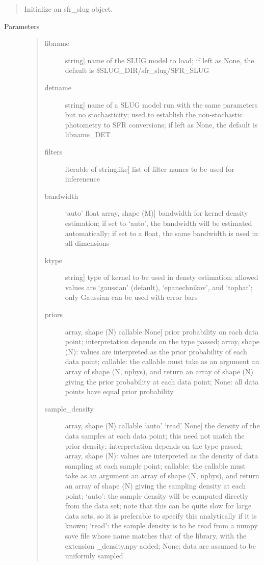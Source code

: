 \documentclass[letterpaper,10pt,english]{sphinxmanual}
\begin{document}
\begin{fulllineitems}
\begin{fulllineitems}
\begin{quote}
Initialize an sfr\_slug object.
\end{quote}
\begin{description}
\item[{Parameters}] \leavevmode\begin{quote}
\begin{description}
\item[{libname}] \leavevmode{[}string{]}
name of the SLUG model to load; if left as None, the default
is \$SLUG\_DIR/sfr\_slug/SFR\_SLUG

\item[{detname}] \leavevmode{[}string{]}
name of a SLUG model run with the same parameters but no
stochasticity; used to establish the non-stochastic
photometry to SFR conversions; if left as None, the default
is libname\_DET

\item[{filters}] \leavevmode{[}iterable of stringlike{]}
list of filter names to be used for inferenence

\item[{bandwidth}] \leavevmode{[}‘auto’ \textbar{} float \textbar{} array, shape (M){]}
bandwidth for kernel density estimation; if set to
‘auto’, the bandwidth will be estimated automatically;
if set to a float, the same bandwidth is used in all
dimensions

\item[{ktype}] \leavevmode{[}string{]}
type of kernel to be used in densty estimation; allowed
values are ‘gaussian’ (default), ‘epanechnikov’, and
‘tophat’; only Gaussian can be used with error bars

\item[{priors}] \leavevmode{[}array, shape (N) \textbar{} callable \textbar{} None{]}
prior probability on each data point; interpretation
depends on the type passed; array, shape (N): values are
interpreted as the prior probability of each data point;
callable: the callable must take as an argument an array
of shape (N, nphys), and return an array of shape (N)
giving the prior probability at each data point; None:
all data points have equal prior probability

\item[{sample\_density}] \leavevmode{[}array, shape (N) \textbar{} callable \textbar{} ‘auto’ \textbar{} ‘read’ \textbar{} None{]}
the density of the data samples at each data point; this
need not match the prior density; interpretation depends
on the type passed; array, shape (N): values are
interpreted as the density of data sampling at each
sample point; callable: the callable must take as an
argument an array of shape (N, nphys), and return an
array of shape (N) giving the sampling density at each
point; ‘auto’: the sample density will be computed
directly from the data set; note that this can be quite
slow for large data sets, so it is preferable to specify
this analytically if it is known; ‘read’: the sample
density is to be read from a numpy save file whose name
matches that of the library, with the extension \_density.npy
added; None: data are assumed to be uniformly sampled


\end{description}
\end{quote}
\end{description}
\end{fulllineitems}
\end{fulllineitems}
\end{document}

